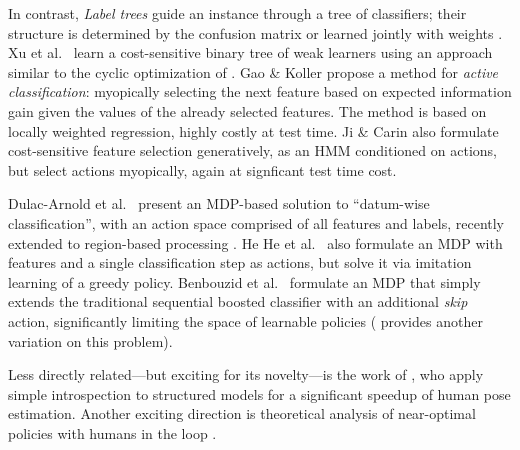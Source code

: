 In contrast, \emph{Label trees} guide an instance through a tree of classifiers; their structure is determined by the confusion matrix or learned jointly with weights \parencite{Deng-NIPS-2011}.
Xu et al.\ \parencite{Xu-ICML-2013} learn a cost-sensitive binary tree of weak learners using an approach similar to the cyclic optimization of \parencite{Chen-AISTATS-2012}.
Gao \& Koller \parencite{Gao-NIPS-2011} propose a method for \emph{active classification}: myopically selecting the next feature based on expected information gain given the values of the already selected features.
The method is based on locally weighted regression, highly costly at test time.
Ji \& Carin \parencite{Ji-PR-2007} also formulate cost-sensitive feature selection generatively, as an HMM conditioned on actions, but select actions myopically, again at signficant test time cost.

Dulac-Arnold et al.\ \parencite{DulacArnold-ML-2012} present an MDP-based solution to ``datum-wise classification'', with an action space comprised of all features and labels, recently extended to region-based processing \parencite{DulacArnold-ICLR-2014}.
He He et al.\ \parencite{HeHe-ICMLW-2012} also formulate an MDP with features and a single classification step as actions, but solve it via imitation learning of a greedy policy.
Benbouzid et al.\ \parencite{Benbouzid-ICML-2012} formulate an MDP that simply extends the traditional sequential boosted classifier with an additional \emph{skip} action, significantly limiting the space of learnable policies (\parencite{Trapeznikov-ML-2012} provides another variation on this problem).

Less directly related---but exciting for its novelty---is the work of \parencite{Weiss-ICCV-2013}, who apply simple introspection to structured models for a significant speedup of human pose estimation.
Another exciting direction is theoretical analysis of near-optimal policies with humans in the loop \parencite{Chen-2014-ICML}.
